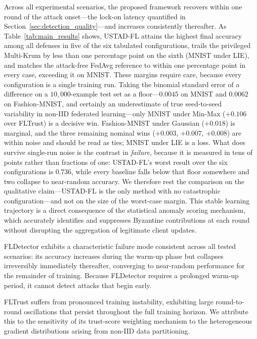 \documentclass[journal]{IEEEtran}
\begin{document}
Across all experimental scenarios, the proposed framework recovers within one round of the attack onset---the lock-on latency quantified in Section~\ref{sec:detection_quality}---and increases consistently thereafter. As Table~\ref{tab:main_results} shows, USTAD-FL attains the highest final accuracy among all defenses in five of the six tabulated configurations, trails the privileged Multi-Krum by less than one percentage point on the sixth (MNIST under LIE), and matches the attack-free FedAvg reference to within one percentage point in every case, exceeding it on MNIST. These margins require care, because every configuration is a single training run. Taking the binomial standard error of a difference on a $10{,}000$-example test set as a floor---$0.0045$ on MNIST and $0.0062$ on Fashion-MNIST, and certainly an underestimate of true seed-to-seed variability in non-IID federated learning---only MNIST under Min-Max ($+0.106$ over FLTrust) is a decisive win. Fashion-MNIST under Gaussian ($+0.018$) is marginal, and the three remaining nominal wins ($+0.003$, $+0.007$, $+0.008$) are within noise and should be read as ties; MNIST under LIE is a loss. What does survive single-run noise is the contrast in \emph{failure}, because it is measured in tens of points rather than fractions of one: USTAD-FL's worst result over the six configurations is $0.736$, while every baseline falls below that floor somewhere and two collapse to near-random accuracy. We therefore rest the comparison on the qualitative claim---USTAD-FL is the only method with no catastrophic configuration---and not on the size of the worst-case margin. This stable learning trajectory is a direct consequence of the statistical anomaly scoring mechanism, which accurately identifies and suppresses Byzantine contributions at each round without disrupting the aggregation of legitimate client updates.


FLDetector exhibits a characteristic failure mode consistent across all tested scenarios: its accuracy increases during the warm-up phase but collapses irreversibly immediately thereafter, converging to near-random performance for the remainder of training. Because FLDetector requires a prolonged warm-up period, it cannot detect attacks that begin early.

FLTrust suffers from pronounced training instability, exhibiting large round-to-round oscillations that persist throughout the full training horizon. We attribute this to the sensitivity of its trust-score weighting mechanism to the heterogeneous gradient distributions arising from non-IID data partitioning.
\end{document}
